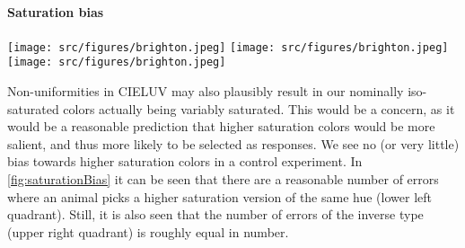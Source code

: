 \paragraph{Saturation bias}

\noindent
\begin{minipage}{\textwidth}
\texttt{[image: src/figures/brighton.jpeg]}
\hfill
\texttt{[image: src/figures/brighton.jpeg]}
\hfill
\texttt{[image: src/figures/brighton.jpeg]}

\end{minipage}


\begin{center}
    
    \label{fig:saturationBias}
\end{center}

Non-uniformities in CIELUV may also plausibly result in our nominally iso-saturated colors actually being variably saturated. This would be a concern, as it would be a reasonable prediction that higher saturation colors would be more salient, and thus more likely to be selected as responses. We see no (or very little) bias towards higher saturation colors in a control experiment. In \autoref{fig:saturationBias} it can be seen that there are a reasonable number of errors where an animal picks a higher saturation version of the same hue (lower left quadrant). Still, it is also seen that the number of errors of the inverse type (upper right quadrant) is roughly equal in number.

